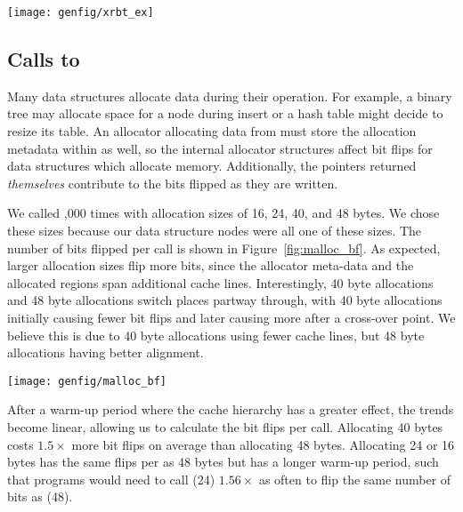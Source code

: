\begin{SCfigure}
	\centering
	\texttt{[image: genfig/xrbt\_ex]}
	\caption{A typical result of running a test program with increasing
		values of \texttt{iteration\_count}.}
	\label{fig:xrbt_ex}
\end{SCfigure}


\subsection{Calls to \malloc}
\label{sec:exp_malloc}

Many data structures allocate data during their operation. For example, a binary
tree may allocate space for a node during insert or a hash table might decide
to resize its table. An allocator allocating data from \NVM must store the
allocation metadata within \NVM as well, so the internal allocator structures
affect bit flips for data structures which allocate memory. Additionally, the
pointers returned \textit{themselves} contribute to the bits flipped as they are
written.

We called ,000 times with allocation sizes of 16, 24, 40, and 48
bytes. We chose these sizes because our data structure nodes were all
one of these sizes. The number of bits flipped per \malloc call is shown
in Figure~\ref{fig:malloc_bf}. As expected, larger allocation sizes flip more
bits, since the allocator meta-data and the allocated regions span additional
cache lines. Interestingly, 40 byte allocations and 48 byte allocations switch
places partway through, with 40 byte allocations initially causing fewer bit
flips and later causing more after a cross-over point. We believe this is due
to 40 byte allocations using fewer cache lines, but 48 byte allocations having
better alignment.

\begin{SCfigure}
	\centering
	\texttt{[image: genfig/malloc\_bf]}
	\caption{Bit flips due to calls to \malloc. Allocation size of 16 bytes is not
		shown because it matches with 24 bytes.}
	\label{fig:malloc_bf}
\end{SCfigure}


After a warm-up period where the cache hierarchy has a greater effect, the
trends become linear, allowing us to calculate the bit flips per \malloc call.
Allocating 40 bytes costs $1.5\times$ more bit flips on average than allocating
48 bytes. Allocating 24 or 16 bytes has the same flips per \malloc as 48 bytes
but has a longer warm-up period, such that programs would need to call \malloc(24)
$1.56\times$ as often to flip the same number of bits as \malloc(48).

